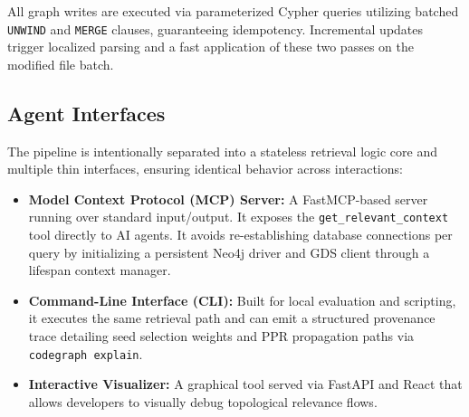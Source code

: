 All graph writes are executed via parameterized Cypher queries utilizing batched \texttt{UNWIND} and \texttt{MERGE} clauses, guaranteeing idempotency. Incremental updates trigger localized parsing and a fast application of these two passes on the modified file batch.

\subsection{Agent Interfaces}

The pipeline is intentionally separated into a stateless retrieval logic core and multiple thin interfaces, ensuring identical behavior across interactions:
\begin{itemize}
    \item \textbf{Model Context Protocol (MCP) Server:} A FastMCP-based server running over standard input/output. It exposes the \texttt{get\_relevant\_context} tool directly to AI agents. It avoids re-establishing database connections per query by initializing a persistent Neo4j driver and GDS client through a lifespan context manager.
    \item \textbf{Command-Line Interface (CLI):} Built for local evaluation and scripting, it executes the same retrieval path and can emit a structured provenance trace detailing seed selection weights and PPR propagation paths via \texttt{codegraph explain}.
    \item \textbf{Interactive Visualizer:} A graphical tool served via FastAPI and React that allows developers to visually debug topological relevance flows.
\end{itemize}
